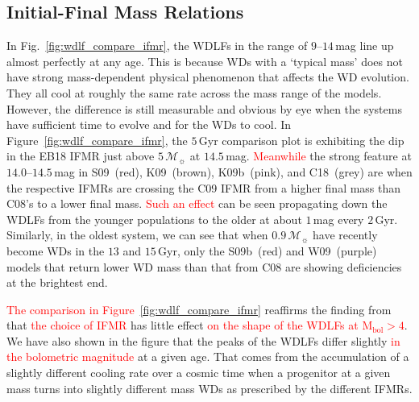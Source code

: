 \documentclass[fleqn,usenatbib]{rasti}
\newcommand{\msun}{\mathcal{M}_{\sun}}
\begin{document}
\subsection{Initial-Final Mass Relations}
In Fig.~\ref{fig:wdlf_compare_ifmr}, the WDLFs in the range of $9$--$14$\,mag
line up almost perfectly at any age. This is because WDs with a `typical mass'
does not have strong mass-dependent physical phenomenon that affects the WD
evolution. They all cool at roughly the same rate across the mass range of the
models. However, the difference is still measurable and obvious by eye when
the systems have sufficient time to evolve and for the WDs to cool. In 
Figure~\ref{fig:wdlf_compare_ifmr}, the $5$\,Gyr comparison plot is exhibiting
the dip in the EB18 IFMR just above $5\,\msun$ at $14.5$\,mag. \textcolor{red}{Meanwhile} the strong
feature at $14.0$--$14.5$\,mag in S09~(red), K09~(brown), K09b~(pink), and
C18~(grey) are when the respective IFMRs are crossing the C09 IFMR from a higher
final mass than C08's to a lower final mass. \textcolor{red}{Such an effect} can be seen propagating
down the WDLFs from the younger populations to the older at about $1$\,mag every
$2$\,Gyr. Similarly, in the oldest system, we can see that when $0.9\,\msun$
have recently become WDs in the $13$ and $15$\,Gyr, only the S09b~(red) and
W09~(purple) models that return lower WD mass than that from C08 are showing
deficiencies at the brightest end. 

\textcolor{red}{The comparison in Figure~\ref{fig:wdlf_compare_ifmr}} reaffirms
the finding from \citet{2008MNRAS.387.1693C} that
\textcolor{red}{the choice of IFMR} has little effect \textcolor{red}{on the
shape of the WDLFs at $\mathrm{M}_{\mathrm{bol}}>4$}.
We have also shown in the figure that the peaks of the WDLFs differ slightly
\textcolor{red}{in the bolometric magnitude} at a given age. That comes from the
accumulation of a slightly different cooling rate over a cosmic time when a
progenitor at a given mass turns into slightly different mass WDs as prescribed
by the different IFMRs.
 
\end{document}
